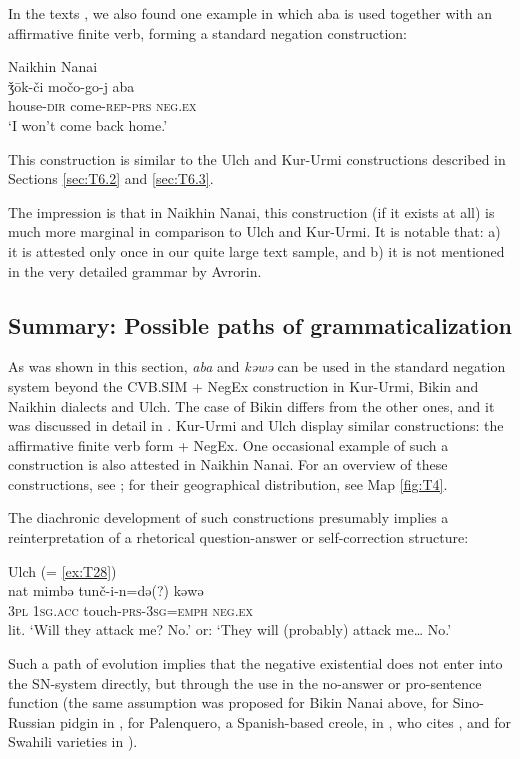 \documentclass[output=paper]{langscibook}
\begin{document}
In the texts \citep{avrorin1986a}, we also found one example in which aba is used together with an affirmative finite verb, forming a standard negation construction:

\ea Naikhin Nanai \label{ex:T31}\\
	\gll ǯōk-či	močo-go-j	aba\\
	house-\textsc{dir}	come-\textsc{rep-prs}	\textsc{neg.ex}\\
	\glt `I won’t come back home.' \citep[192, text]{avrorin1986a}
\z

This construction is similar to the Ulch and Kur-Urmi constructions described in Sections \ref{sec:T6.2} and \ref{sec:T6.3}.

The impression is that in Naikhin Nanai, this construction (if it exists at all) is much more marginal in comparison to Ulch and Kur-Urmi. It is notable that: a) it is attested only once in our quite large text sample, and b) it is not mentioned in the very detailed grammar by Avrorin.

\subsection{Summary: Possible paths of grammaticalization}\label{sec:T6.5}

As was shown in this section, \textit{aba} and \textit{kəwə} can be used in the standard negation system beyond the CVB.SIM + NegEx construction in Kur-Urmi, Bikin and Naikhin dialects and Ulch. The case of Bikin differs from the other ones, and it was discussed in detail in . Kur-Urmi and Ulch display similar constructions: the affirmative finite verb form + NegEx. One occasional example of such a construction is also attested in Naikhin Nanai. For an overview of these constructions, see ; for their geographical distribution, see Map \ref{fig:T4}.

The diachronic development of such constructions presumably implies a reinterpretation of a rhetorical question-answer or self-correction structure:

\ea Ulch (= \ref{ex:T28}) \label{ex:}\\
	\gll nat	mimbə	tunč-i-n=də(?)		kəwə\\
	\textsc{3pl}	\textsc{1sg.acc}	touch-\textsc{prs-3sg=emph}	\textsc{neg.ex}\\
	\glt lit. `Will they attack me? No.’ or: `They will (probably) attack me… No.’
\z

Such a path of evolution implies that the negative existential does not enter into the SN-system directly, but through the use in the no-answer or pro-sentence function (the same assumption was proposed for Bikin Nanai above, for Sino-Russian pidgin in \citealt[155--156]{Veselinova2016}, for Palenquero, a Spanish-based creole, in \citealt[21]{Croft1991}, who cites \citealt{Schwegler1988}, and for Swahili varieties in ).
\end{document}
